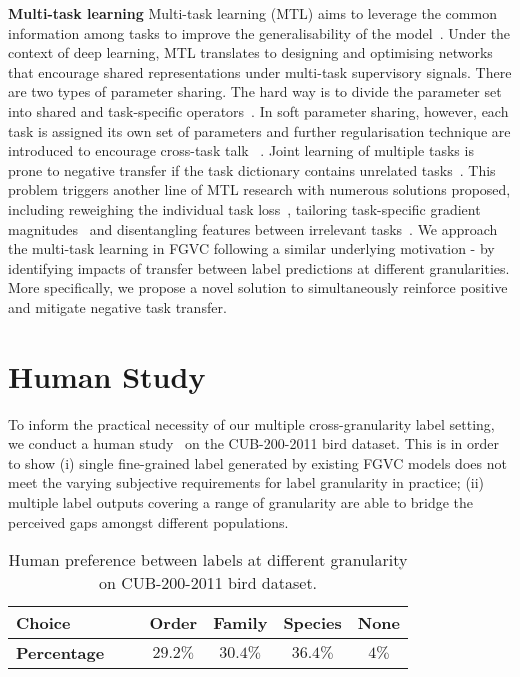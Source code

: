\documentclass[final]{cvpr}
\newcommand{\keypoint}[1]{\vspace{0.05cm}\noindent\textbf{#1}\quad}
\begin{document}
\keypoint{Multi-task learning} Multi-task learning (MTL) aims to leverage the common information among tasks to improve the generalisability of the model~\cite{chen2018driving,chen2019progressive,luo2020multi,zhou2020pattern}. 
Under the context of deep learning, MTL translates to designing and optimising networks that encourage shared representations under multi-task supervisory signals. There are two types of parameter sharing. The hard way is to divide the parameter set into shared and task-specific operators~\cite{kokkinos2017ubernet, kendall2018multi, chen2018gradnorm}. In soft parameter sharing, however, each task is assigned its own set of parameters and 
further regularisation technique are introduced to encourage cross-task talk ~\cite{misra2016cross,ruder2019latent,gao2019nddr}.
Joint learning of multiple tasks is prone to negative transfer if the task dictionary contains unrelated tasks~\cite{kokkinos2017ubernet,he2017mask}. This problem triggers another line of MTL research with numerous solutions proposed, including reweighing the individual task loss~\cite{kendall2018multi,sinha2018gradient}, 
tailoring task-specific gradient magnitudes~\cite{chen2018gradnorm} and disentangling features between irrelevant tasks~\cite{guo2018dynamic,zhao2018modulation}. 
We approach the multi-task learning in FGVC following a similar underlying motivation - by identifying impacts of transfer between label predictions at different granularities. More specifically, we propose a novel solution to simultaneously reinforce positive and mitigate negative task transfer.


\section{Human Study}\label{Pilot_Study}


To inform the practical necessity of our multiple cross-granularity label setting, we conduct a human study~\cite{granqvist2013hedging} on the CUB-200-2011 bird dataset. This is in order to show (i) single fine-grained label generated by existing FGVC models does not meet the varying subjective requirements for label granularity in practice; (ii) multiple label outputs covering a range of granularity are able to bridge the perceived gaps amongst different populations.


\begin{table}[!t]
  \centering

 \begin{adjustbox}{width=0.9\linewidth,center}
       \footnotesize   \begin{tabular}{l|cccc}
    \toprule
    \textbf{Choice} \ \ \ & \textbf{Order} & \textbf{Family} & \textbf{Species} & \textbf{None}\\
    \midrule
    \textbf{Percentage} \ \ \ & $29.2\%$ & $30.4\%$ & $36.4\%$ & $4\%$ \\
    \bottomrule
    \end{tabular}\end{adjustbox}
  \caption{Human preference between labels at different granularity on CUB-200-2011 bird dataset.}
  \label{tab:addlabel}\vspace{-4mm}
\end{table}
\end{document}
